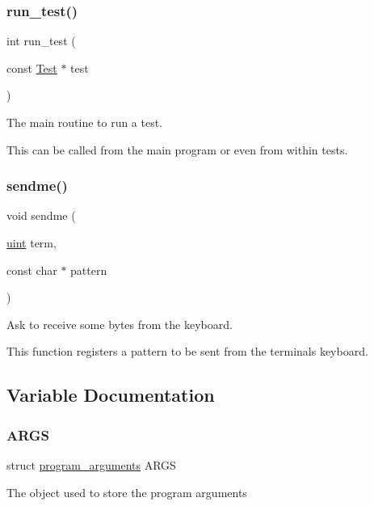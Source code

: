 \subsubsection{\texorpdfstring{run\+\_\+test()}{run\_test()}}
{\footnotesize\ttfamily int run\+\_\+test (\begin{DoxyParamCaption}\item[{const \hyperlink{structTest}{Test} $\ast$}]{test }\end{DoxyParamCaption})}



The main routine to run a test. 

This can be called from the main program or even from within tests. \mbox{\label{group__Testing_ga0f97d30c4cd1370bcac6d7f4775d6789}} 
\subsubsection{\texorpdfstring{sendme()}{sendme()}}
{\footnotesize\ttfamily void sendme (\begin{DoxyParamCaption}\item[{\hyperlink{bios_8h_a91ad9478d81a7aaf2593e8d9c3d06a14}{uint}}]{term,  }\item[{const char $\ast$}]{pattern }\end{DoxyParamCaption})}



Ask to receive some bytes from the keyboard. 

This function registers a pattern to be sent from the terminal\textquotesingle{}s keyboard. 

\subsection{Variable Documentation}
\mbox{\label{group__Testing_ga0bc61f89e22f48a0af7de4659a69c6f2}} 
\subsubsection{\texorpdfstring{A\+R\+GS}{ARGS}}
{\footnotesize\ttfamily struct \hyperlink{structprogram__arguments}{program\+\_\+arguments}  A\+R\+GS}

The object used to store the program arguments 